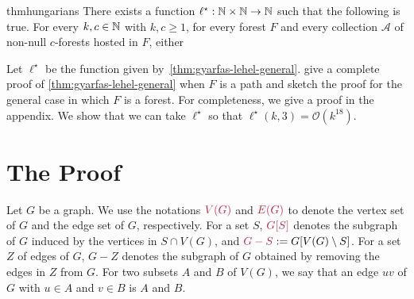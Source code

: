 \documentclass{patmorin}
\newcommand{\piotr}[1]{\textcolor{red}{Piotr: #1}}
\newcommand{\Oh}{\mathcal{O}}
\begin{document}
\begin{restatable}
{thm}{hungarians}\label{thm:gyarfas-lehel-general}
   There exists a function $\ell^\star:\mathbb{N}\times\mathbb{N}\to\mathbb{N}$ such that the following is true. For every $k,c\in\mathbb{N}$ with $k,c\geq1$, for every forest $F$ and
    every collection $\mathcal{A}$ of non-null $c$-forests hosted in $F$, either
\end{restatable}
Let $\ell^\star$ be the function given by~\cref{thm:gyarfas-lehel-general}. \citet{gyarfas.lehel:helly} give a complete proof of \cref{thm:gyarfas-lehel-general} when $F$ is a path and sketch the proof for the general case in which $F$ is a forest.
For completeness, we give a proof in the appendix.
We show that we can take $\ell^\star$ so that $\ell^\star(k,3)=\Oh(k^{18})$.




\section{The Proof}
\label{proof}

Let $G$ be a graph.  We use the notations $\mathdefin{V(G)}$ and $\mathdefin{E(G)}$ to denote the vertex set of $G$ and the edge set of $G$, respectively.  For a set $S$, $\mathdefin{G[S]}$ denotes the subgraph of $G$ induced by the vertices in $S\cap V(G)$, and $\mathdefin{G-S}:=G[V(G)\setminus S]$.  For a set $Z$ of edges of $G$, $G-Z$ denotes the subgraph of $G$ obtained by removing the edges in $Z$ from $G$.  For two subsets $A$ and $B$ of $V(G)$, we say that an edge $uv$ of $G$ with $u\in A$ and $v\in B$ is  $A$ and $B$.
\end{document}
